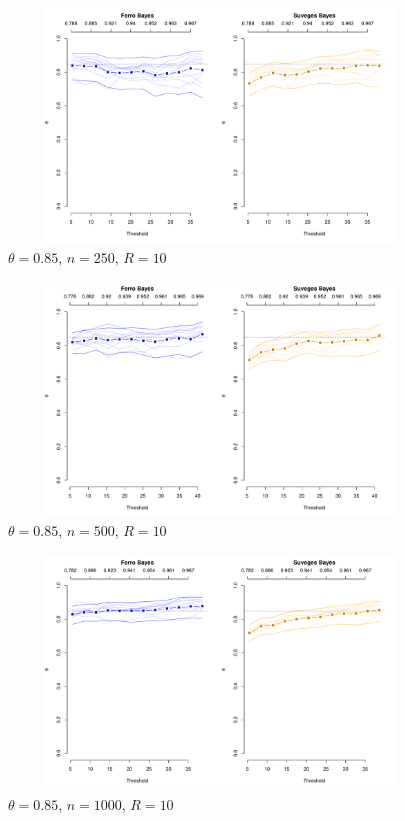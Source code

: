 \documentclass[12pt]{article}
\begin{document}
\newpage

\begin{figure}
\begin{center}
\includegraphics[width=5.5in, height=2.45in]{../extremal_comparison/figs/sim_frechet_hier_85_250_10.pdf}
\caption{$\theta=0.85$, $n=250$, $R=10$}
\end{center}
\end{figure}

\begin{figure}
\begin{center}
\includegraphics[width=5.5in, height=2.45in]{../extremal_comparison/figs/sim_frechet_hier_85_500_10.pdf}
\caption{$\theta=0.85$, $n=500$, $R=10$}
\end{center}
\end{figure}

\begin{figure}
\begin{center}
\includegraphics[width=5.5in, height=2.45in]{../extremal_comparison/figs/sim_frechet_hier_85_1000_10.pdf}
\caption{$\theta=0.85$, $n=1000$, $R=10$}
\end{center}
\end{figure}
\end{document}
